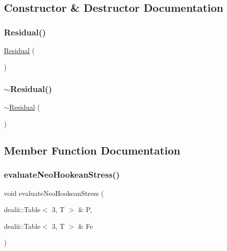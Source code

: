 \subsection{Constructor \& Destructor Documentation}
\mbox{\label{class_residual_a4b540ba8e3ad0a1f8cfe2b4acd20493b}} 
\subsubsection{\texorpdfstring{Residual()}{Residual()}}
{\footnotesize\ttfamily \mbox{\hyperlink{class_residual}{Residual}} (\begin{DoxyParamCaption}{ }\end{DoxyParamCaption})}

\mbox{\label{class_residual_a8eef8c757003dd763b7dddc733f65641}} 
\subsubsection{\texorpdfstring{$\sim$Residual()}{~Residual()}}
{\footnotesize\ttfamily $\sim$\mbox{\hyperlink{class_residual}{Residual}} (\begin{DoxyParamCaption}{ }\end{DoxyParamCaption})}



\subsection{Member Function Documentation}
\mbox{\label{class_residual_a0f9ff6a237d377803ce368b26ca39652}} 
\subsubsection{\texorpdfstring{evaluateNeoHookeanStress()}{evaluateNeoHookeanStress()}}
{\footnotesize\ttfamily void evaluate\+Neo\+Hookean\+Stress (\begin{DoxyParamCaption}\item[{dealii\+::\+Table$<$ 3, T $>$ \&}]{P,  }\item[{dealii\+::\+Table$<$ 3, T $>$ \&}]{Fe }\end{DoxyParamCaption})}

